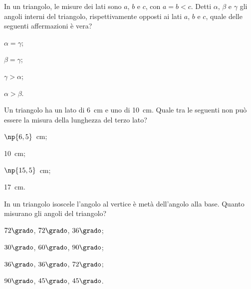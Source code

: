 \begin{multicols}{2}
\begin{esercizio}
\label{ese:3.115}
In un triangolo, le misure dei lati sono $a$, $b$ e $c$, con $a = b < 
c$. Detti $\alpha$, $\beta$ e $\gamma$ gli angoli interni del 
triangolo, rispettivamente opposti ai lati $a$, $b$ e $c$, quale 
delle seguenti affermazioni è vera?
\begin{multicols}{4}
\begin{enumeratea}
\item $\alpha = \gamma$;
\item $\beta = \gamma$;
\item $\gamma > \alpha$;
\item $\alpha > \beta$.
\end{enumeratea}
\end{multicols}
\end{esercizio}

\begin{esercizio}
\label{ese:3.116}
Un triangolo ha un lato di 6~cm e uno di 10~cm. Quale tra le seguenti 
non può essere la misura della lunghezza del terzo lato?
\begin{multicols}{4}
\begin{enumeratea}
\item $\np{6,5}$~cm;
\item 10~cm;
\item $\np{15,5}$~cm;
\item 17~cm.
\end{enumeratea}
\end{multicols}
\end{esercizio}

\pagebreak

\begin{esercizio}
\label{ese:3.117}
In un triangolo isoscele l'angolo al vertice è metà dell'angolo alla 
base. Quanto misurano gli angoli del triangolo?
\begin{multicols}{4}
\begin{enumeratea}
\item $72\grado$, $72\grado$, $36\grado$;
\item $30\grado$, $60\grado$, $90\grado$;
\item $36\grado$, $36\grado$, $72\grado$;
\item $90\grado$, $45\grado$, $45\grado$.
\end{enumeratea}
\end{multicols}
\end{esercizio}



\end{multicols}
